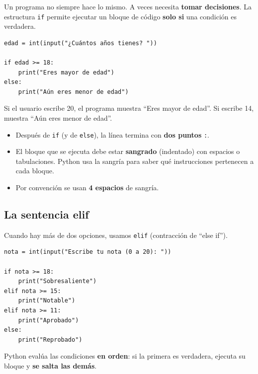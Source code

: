 \documentclass[11pt,a4paper]{article}
\begin{document}
Un programa no siempre hace lo mismo. A veces necesita \textbf{tomar decisiones}. La estructura \texttt{if} permite ejecutar un bloque de código \textbf{solo si} una condición es verdadera.

\begin{cajaEjemplo}
\begin{lstlisting}[style=pythonStyle, caption={Primer condicional}]
edad = int(input("¿Cuántos años tienes? "))

if edad >= 18:
    print("Eres mayor de edad")
else:
    print("Aún eres menor de edad")
\end{lstlisting}

Si el usuario escribe 20, el programa muestra ``Eres mayor de edad''. Si escribe 14, muestra ``Aún eres menor de edad''.
\end{cajaEjemplo}

\begin{cajaRecuerda}
\begin{itemize}
    \item Después de \texttt{if} (y de \texttt{else}), la línea termina con \textbf{dos puntos} \texttt{:}.
    \item El bloque que se ejecuta debe estar \textbf{sangrado} (indentado) con espacios o tabulaciones. Python usa la sangría para saber qué instrucciones pertenecen a cada bloque.
    \item Por convención se usan \textbf{4 espacios} de sangría.
\end{itemize}
\end{cajaRecuerda}

\subsection{La sentencia elif}

Cuando hay más de dos opciones, usamos \texttt{elif} (contracción de ``else if'').

\begin{cajaEjemplo}
\begin{lstlisting}[style=pythonStyle, caption={Varias opciones con elif}]
nota = int(input("Escribe tu nota (0 a 20): "))

if nota >= 18:
    print("Sobresaliente")
elif nota >= 15:
    print("Notable")
elif nota >= 11:
    print("Aprobado")
else:
    print("Reprobado")
\end{lstlisting}

Python evalúa las condiciones \textbf{en orden}: si la primera es verdadera, ejecuta su bloque y \textbf{se salta las demás}.
\end{cajaEjemplo}
\end{document}
